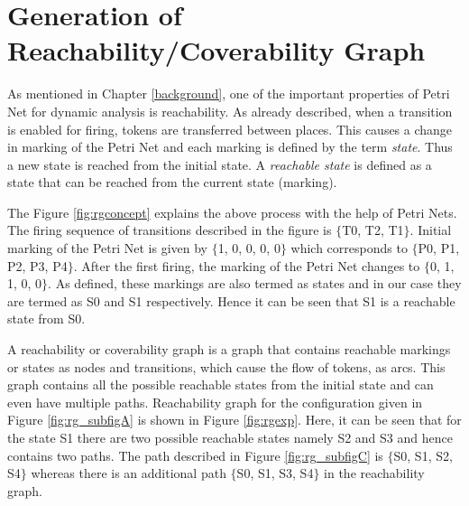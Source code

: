 \section{Generation of Reachability/Coverability Graph}
As mentioned in Chapter \ref{background}, one of the important properties of Petri Net for dynamic analysis is reachability. As already described, when a transition is enabled for firing, tokens are transferred between places. This causes a change in marking of the Petri Net and each marking is defined by the term \textit{state}. Thus a new state is reached from the initial state. A \textit{reachable state} is defined as a state that can be reached from the current state (marking).

The Figure \ref{fig:rgconcept} explains the above process with the help of Petri Nets. The firing sequence of transitions described in the figure is $ \lbrace $T0, T2, T1$ \rbrace $. Initial marking of the Petri Net is given by $ \lbrace $1, 0, 0, 0, 0$ \rbrace $ which corresponds to $ \lbrace $P0, P1, P2, P3, P4$ \rbrace $. After the first firing, the marking of the Petri Net changes to $ \lbrace $0, 1, 1, 0, 0$ \rbrace $. As defined, these markings are also termed as states and in our case they are termed as S0 and S1 respectively. Hence it can be seen that S1 is a reachable state from S0.

A reachability or coverability graph is a graph that contains reachable markings or states as nodes and transitions, which cause the flow of tokens, as arcs. This graph contains all the possible reachable states from the initial state and can even have multiple paths. Reachability graph for the configuration given in Figure \ref{fig:rg_subfigA} is shown in Figure \ref{fig:rgexp}. Here, it can be seen that for the state S1 there are two possible reachable states namely S2 and S3 and hence contains two paths. The path described in Figure \ref{fig:rg_subfigC} is $ \lbrace $S0, S1, S2, S4$ \rbrace $ whereas there is an additional path $ \lbrace $S0, S1, S3, S4$ \rbrace $ in the reachability graph.

